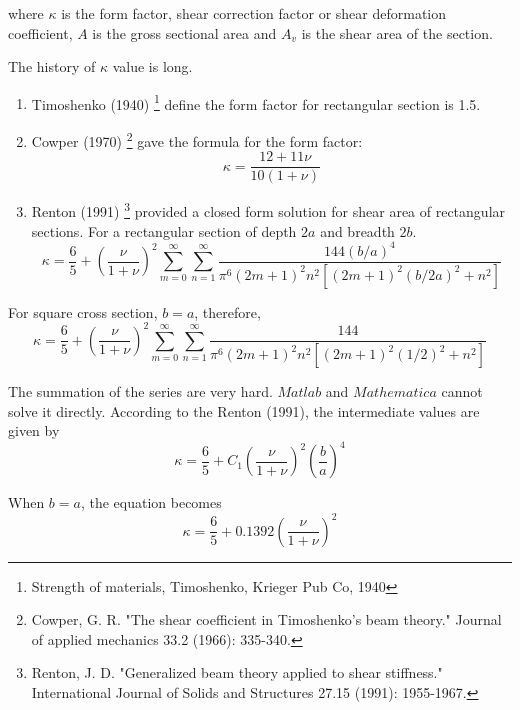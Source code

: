 \documentclass[fleqn,11pt]{article}
\begin{document}
where $\kappa$ is the form factor, shear correction factor or shear deformation coefficient, $A$ is the gross sectional area and $A_v$ is the shear area of the section. 

The history of $\kappa$ value is long. 
\begin{enumerate}
  \item Timoshenko (1940) \footnote{Strength of materials, Timoshenko, Krieger Pub Co, 1940} define the form factor for rectangular section is 1.5. 
  \item Cowper (1970) \footnote{Cowper, G. R. "The shear coefficient in Timoshenko’s beam theory." Journal of applied mechanics 33.2 (1966): 335-340.} gave the formula for the form factor:
    \begin{equation}
      \kappa=\frac{12+11\nu}{10(1+\nu)}
    \end{equation}
  \item Renton (1991) \footnote{Renton, J. D. "Generalized beam theory applied to shear stiffness." International Journal of Solids and Structures 27.15 (1991): 1955-1967.}  provided a closed form solution for shear area of rectangular sections. For a rectangular section of depth $2a$ and breadth $2b$.
    \begin{equation}
      \kappa=\frac{6}{5}+ (\frac{\nu}{1+\nu})^2 \sum_{m=0}^{\infty}\sum_{n=1}^{\infty} \frac{144(b/a)^4}{\pi^6 (2m+1)^2 n^2 [(2m+1)^2(b/2a)^2+n^2]}
    \end{equation}
\end{enumerate}





For square cross section, $b=a$, therefore, 
\begin{equation}
  \kappa= \frac{6}{5}+ (\frac{\nu}{1+\nu})^2 \sum_{m=0}^{\infty}\sum_{n=1}^{\infty} \frac{144}{\pi^6 (2m+1)^2 n^2 [(2m+1)^2(1/2)^2+n^2]}
\end{equation}

The summation of the series are very hard. $Matlab$ and $Mathematica$ cannot solve it directly. According to the Renton (1991), the intermediate values are given by
\begin{equation}
  \kappa=\frac{6}{5}+ C_1 (\frac{\nu}{1+\nu})^2 (\frac{b}{a})^4
\end{equation}

When $b=a$, the equation becomes
\begin{equation}
  \kappa=\frac{6}{5}+ 0.1392 (\frac{\nu}{1+\nu})^2 
\end{equation}
\end{document}
